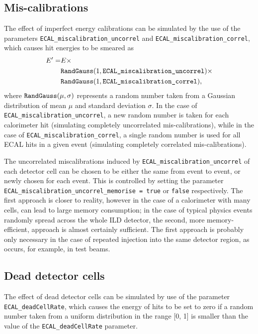 \documentclass[12pt]{article} %
\begin{document}
\subsection{Mis-calibrations}
The effect of imperfect energy calibrations can be simulated by the use of the parameters
{\tt ECAL\_miscalibration\_uncorrel} and {\tt ECAL\_miscalibration\_correl}, which causes hit energies to
be smeared as 
\begin{equation*}
\begin{split}
E' = & E \times \\
& \text{\tt RandGauss} ( 1, \text{\tt ECAL\_miscalibration\_uncorrel}) \times \\
& \text{\tt RandGauss} ( 1, \text{\tt ECAL\_miscalibration\_correl}) ,
\end{split}
\end{equation*}
where $\text{\tt RandGauss} (\mu, \sigma)$ represents a random number taken from a Gaussian distribution of mean $\mu$ and 
standard deviation $\sigma$. In the case of {\tt ECAL\_miscalibration\_uncorrel}, a new random number is taken for each 
calorimeter hit (simulating completely uncorrelated mis-calibrations), 
while in the case of {\tt ECAL\_miscalibration\_correl}, a single random number is used for all ECAL 
hits in a given event (simulating completely correlated mis-calibrations).

The uncorrelated miscalibrations induced by {\tt ECAL\_miscalibration\_uncorrel} of each detector cell can be chosen to be either 
the same from event to event, or newly chosen for each event. 
This is controlled by setting the parameter {\tt ECAL\_miscalibration\_uncorrel\_memorise = true} or {\tt false} respectively.
The first approach is closer to reality, however in the case of a calorimeter with many cells, can lead to large memory consumption;
in the case of typical physics events randomly spread across the whole ILD detector, the second, more memory-efficient, 
approach is almost certainly sufficient. The first approach is probably only necessary in the case of repeated injection into the same detector
region, as occurs, for example, in test beams.

\subsection{Dead detector cells}
The effect of dead detector cells can be simulated by use of the parameter {\tt ECAL\_deadCellRate}, which causes the energy
of hits to be set to zero if a random number taken from a uniform distribution in the range [0, 1] is smaller than the 
value of the {\tt ECAL\_deadCellRate} parameter.
\end{document}
